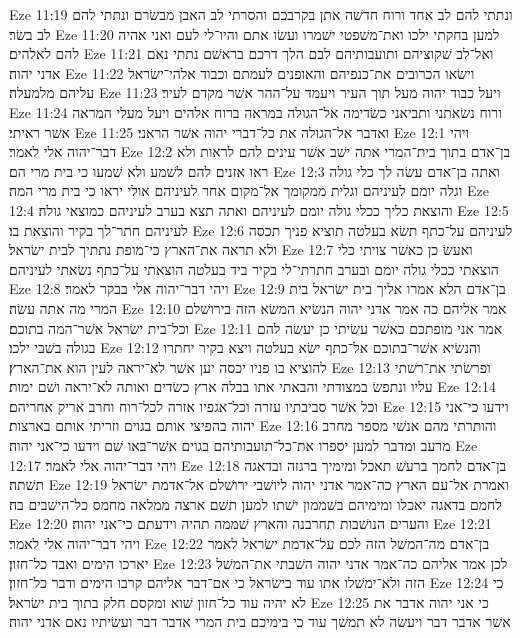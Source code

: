 Eze 11:19  ונתתי להם לב אחד ורוח חדשׁה אתן בקרבכם והסרתי לב האבן מבשׂרם ונתתי להם לב בשׂר׃
Eze 11:20  למען בחקתי ילכו ואת־משׁפטי ישׁמרו ועשׂו אתם והיו־לי לעם ואני אהיה להם לאלהים׃
Eze 11:21  ואל־לב שׁקוציהם ותועבותיהם לבם הלך דרכם בראשׁם נתתי נאם אדני יהוה׃
Eze 11:22  וישׂאו הכרובים את־כנפיהם והאופנים לעמתם וכבוד אלהי־ישׂראל עליהם מלמעלה׃
Eze 11:23  ויעל כבוד יהוה מעל תוך העיר ויעמד על־ההר אשׁר מקדם לעיר׃
Eze 11:24  ורוח נשׂאתני ותביאני כשׂדימה אל־הגולה במראה ברוח אלהים ויעל מעלי המראה אשׁר ראיתי׃
Eze 11:25  ואדבר אל־הגולה את כל־דברי יהוה אשׁר הראני׃
Eze 12:1  ויהי דבר־יהוה אלי לאמר׃
Eze 12:2  בן־אדם בתוך בית־המרי אתה ישׁב אשׁר עינים להם לראות ולא ראו אזנים להם לשׁמע ולא שׁמעו כי בית מרי הם׃
Eze 12:3  ואתה בן־אדם עשׂה לך כלי גולה וגלה יומם לעיניהם וגלית ממקומך אל־מקום אחר לעיניהם אולי יראו כי בית מרי המה׃
Eze 12:4  והוצאת כליך ככלי גולה יומם לעיניהם ואתה תצא בערב לעיניהם כמוצאי גולה׃
Eze 12:5  לעיניהם חתר־לך בקיר והוצאת בו׃
Eze 12:6  לעיניהם על־כתף תשׂא בעלטה תוציא פניך תכסה ולא תראה את־הארץ כי־מופת נתתיך לבית ישׂראל׃
Eze 12:7  ואעשׂ כן כאשׁר צויתי כלי הוצאתי ככלי גולה יומם ובערב חתרתי־לי בקיר ביד בעלטה הוצאתי על־כתף נשׂאתי לעיניהם׃
Eze 12:8  ויהי דבר־יהוה אלי בבקר לאמר׃
Eze 12:9  בן־אדם הלא אמרו אליך בית ישׂראל בית המרי מה אתה עשׂה׃
Eze 12:10  אמר אליהם כה אמר אדני יהוה הנשׂיא המשׂא הזה בירושׁלם וכל־בית ישׂראל אשׁר־המה בתוכם׃
Eze 12:11  אמר אני מופתכם כאשׁר עשׂיתי כן יעשׂה להם בגולה בשׁבי ילכו׃
Eze 12:12  והנשׂיא אשׁר־בתוכם אל־כתף ישׂא בעלטה ויצא בקיר יחתרו להוציא בו פניו יכסה יען אשׁר לא־יראה לעין הוא את־הארץ׃
Eze 12:13  ופרשׂתי את־רשׁתי עליו ונתפשׂ במצודתי והבאתי אתו בבלה ארץ כשׂדים ואותה לא־יראה ושׁם ימות׃
Eze 12:14  וכל אשׁר סביבתיו עזרה וכל־אגפיו אזרה לכל־רוח וחרב אריק אחריהם׃
Eze 12:15  וידעו כי־אני יהוה בהפיצי אותם בגוים וזריתי אותם בארצות׃
Eze 12:16  והותרתי מהם אנשׁי מספר מחרב מרעב ומדבר למען יספרו את־כל־תועבותיהם בגוים אשׁר־באו שׁם וידעו כי־אני יהוה׃
Eze 12:17  ויהי דבר־יהוה אלי לאמר׃
Eze 12:18  בן־אדם לחמך ברעשׁ תאכל ומימיך ברגזה ובדאגה תשׁתה׃
Eze 12:19  ואמרת אל־עם הארץ כה־אמר אדני יהוה ליושׁבי ירושׁלם אל־אדמת ישׂראל לחמם בדאגה יאכלו ומימיהם בשׁממון ישׁתו למען תשׁם ארצה ממלאה מחמס כל־הישׁבים בה׃
Eze 12:20  והערים הנושׁבות תחרבנה והארץ שׁממה תהיה וידעתם כי־אני יהוה׃
Eze 12:21  ויהי דבר־יהוה אלי לאמר׃
Eze 12:22  בן־אדם מה־המשׁל הזה לכם על־אדמת ישׂראל לאמר יארכו הימים ואבד כל־חזון׃
Eze 12:23  לכן אמר אליהם כה־אמר אדני יהוה השׁבתי את־המשׁל הזה ולא־ימשׁלו אתו עוד בישׂראל כי אם־דבר אליהם קרבו הימים ודבר כל־חזון׃
Eze 12:24  כי לא יהיה עוד כל־חזון שׁוא ומקסם חלק בתוך בית ישׂראל׃
Eze 12:25  כי אני יהוה אדבר את אשׁר אדבר דבר ויעשׂה לא תמשׁך עוד כי בימיכם בית המרי אדבר דבר ועשׂיתיו נאם אדני יהוה׃
